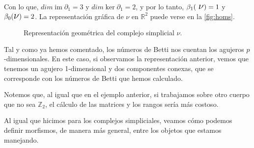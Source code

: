 \documentclass[12pt, a4paper, twoside]{book}
\numberwithin{equation}{section}
\theoremstyle{definition}
\newenvironment{ejem}
  {\pushQED{\qed}\renewcommand{\qedsymbol}{$\blacktriangleleft$}\ejemplo}
  {\popQED\endejemplo}
\theoremstyle{remark}
\theoremstyle{plain}
\DeclareMathOperator{\Ima}{im}
\begin{document}
\begin{ejem}
		Con lo que, $dim \Ima \partial_{1}=3 \text{ y } 
		dim \ker \partial_{1}=2$, y por lo tanto, $\beta_{1}(\text{
		{\Large $\nu$}})=1$ y $\beta_{0}(\text{{\Large $\nu$}})=2$. La
		representación gráfica de {\Large $\nu$} en $\mathbb{R}^{2}$
		puede verse en la \autoref{fig:homs}.
		
		\begin{figure}[!htbp]
			\centering
			\caption{Representación geométrica del complejo simplicial {\Large $\nu$}.}
			\label{fig:homs}
		\end{figure}
		
		Tal y como ya hemos comentado, los números de Betti nos 
		cuentan los agujeros $p$-dimensionales. En este caso, si 
		observamos la representación anterior, vemos que tenemos un 
		agujero 1-dimensional y dos componentes conexas, que se 
		corresponde con los números de Betti que hemos calculado. 

		Notemos que, al igual que en el ejemplo anterior, si 
		trabajamos sobre otro cuerpo que no sea $\mathbb{Z}_{2}$, el 
		cálculo de las matrices y los rangos sería más costoso.	
	\end{ejem}
	
	Al igual que hicimos para los complejos simpliciales, veamos cómo 
	podemos definir morfismos, de manera más general, entre los objetos 
	que estamos manejando.
	
\end{document}
